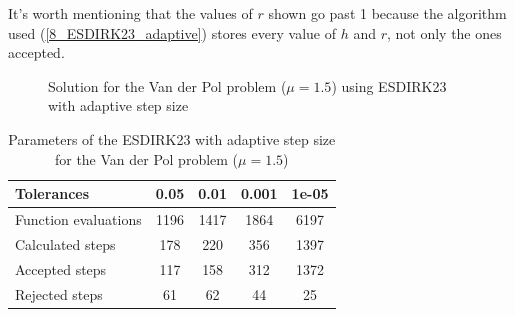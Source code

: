 It's worth mentioning that the values of $r$ shown go past 1 because the algorithm used (\ref{8_ESDIRK23_adaptive}) stores every value of $h$ and $r$, not only the ones accepted. 
\begin{figure}[H]
    \centering
    \caption{Solution for the Van der Pol problem ($\mathit{\mu = 1.5}$) using ESDIRK23 with adaptive step size}
    \label{8_4_mu_1_5}
\end{figure}

\begin{table}[H]
    \centering
    \begin{tabular}{@{}l|cccc@{}}
    \toprule
    Tolerances           & 0.05 & 0.01 & 0.001 & 1e-05 \\ \midrule
    Function evaluations & 1196 & 1417 & 1864  & 6197  \\
    Calculated steps     & 178  & 220  & 356   & 1397  \\
    Accepted steps       & 117  & 158  & 312   & 1372  \\
    Rejected steps       & 61   & 62   & 44    & 25    \\ \bottomrule
    \end{tabular}
    \caption{Parameters of the ESDIRK23 with adaptive step size for the Van der Pol problem ($\mathit{\mu = 1.5}$)}
    \label{8_4_adaptive_mu_1_5_table}
\end{table}

